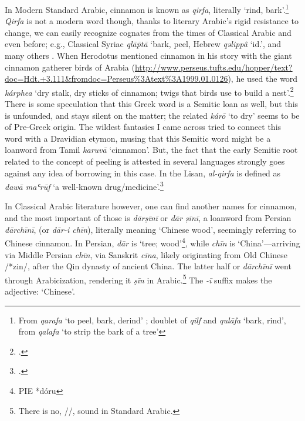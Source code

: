 In Modern Standard Arabic, cinnamon is known as 
\textit{qirfa}, literally `rind, bark'.\footnote{From \textit{qarafa} `to peel, bark, derind' \autocite[s.v. qarafa]{wehr_dictionary_1976}; doublet of \textit{qilf} and \textit{qulāfa} `bark, rind', from \textit{qalafa} `to strip the bark of a tree'} \textit{Qirfa} is not a modern word though, thanks to literary Arabic's rigid resistance to change, we can easily recognize cognates from the times of Classical Arabic and even before; e.g., Classical Syriac  \textit{qlāp̄tā} `bark, peel, Hebrew  \textit{qəlippâ} `id.', and many others \autocite[see][427]{leslau_comparative_1991}.
When Herodotus mentioned cinnamon in his story with the giant cinnamon gatherer birds of Arabia (\href{3.111}{http://www.perseus.tufts.edu/hopper/text?doc=Hdt.+3.111\&fromdoc=Perseus\%3Atext\%3A1999.01.0126}), he used the word  \textit{kárphea} `dry stalk, dry sticks of cinnamon; twigs that birds use to build a nest'.\footcite[s.v. κάρφεα]{liddell_greek-english_1940} 
There is some speculation that this Greek word is a Semitic loan as well, but this is unfounded, and \textcite{beekes_etymological_2010} stays silent on the matter; the related \textit{kárō} `to dry' seems to be of Pre-Greek origin. The wildest fantasies I came across tried to connect this word with a Dravidian etymon, musing that this Semitic word might be a loanword from Tamil  \textit{karuvā} `cinnamon'.
But, the fact that the early Semitic root related to the concept of peeling is attested in several languages strongly goes against any idea of borrowing in this case. In the \gls{Lisan}, \textit{al-qirfa} is defined as \textit{daw\={a} maʿr\={u}f} `a well-known drug/medicine'.\footcite[3599 ]{ibn_manzur_lisan_1979}



In Classical Arabic literature however, one can find another names for cinnamon, and the most important of those is  
\textit{dārṣīnī} or  
\textit{dār ṣīnī}, a loanword from Persian 
\textit{dārchīnī}, (or  
\textit{dār-i chīn}), literally meaning `Chinese wood', seemingly referring to Chinese cinnamon. In Persian, \textit{dār} is `tree; wood'\footnote{\gls{PIE} *dóru}, while \textit{chīn} is `China'---arriving via Middle Persian \textit{chīn}, via Sanskrit  \textit{cīna}, likely originating from Old Chinese  /*zin/, after the Qin dynasty of ancient China. The latter half or \textit{dārchīnī} went through Arabicization, rendering it \textit{ṣīn} in Arabic.\footnote{There is no, /\textipa{\t{\textteshlig}}/, sound in Standard Arabic.} The \textit{-ī} suffix makes the adjective: `Chinese'. 

